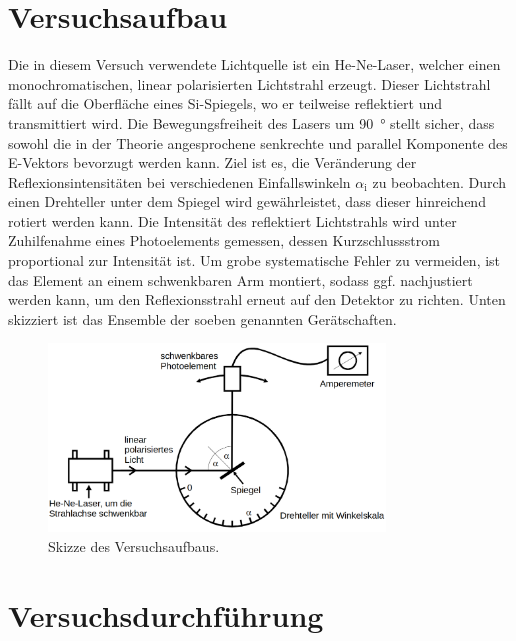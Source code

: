 



\section{Versuchsaufbau}
\label{sec:Versuchsaufbau}

Die in diesem Versuch verwendete Lichtquelle ist ein He-Ne-Laser, welcher einen monochromatischen, linear polarisierten Lichtstrahl erzeugt. Dieser Lichtstrahl 
fällt auf die Oberfläche eines Si-Spiegels, wo er teilweise reflektiert und transmittiert wird. Die Bewegungsfreiheit des Lasers um \qty{90}{\degree} stellt 
sicher, dass sowohl die in der Theorie angesprochene senkrechte und parallel Komponente des E-Vektors bevorzugt werden kann. Ziel ist es, die Veränderung der 
Reflexionsintensitäten bei verschiedenen Einfallswinkeln $\alpha_\text{i}$ zu beobachten. Durch einen Drehteller unter dem Spiegel wird gewährleistet, dass 
dieser hinreichend rotiert werden kann. Die Intensität des reflektiert Lichtstrahls wird unter Zuhilfenahme eines Photoelements gemessen, dessen Kurzschlussstrom 
proportional zur Intensität ist. Um grobe systematische Fehler zu vermeiden, ist das Element an einem schwenkbaren Arm montiert, sodass ggf. nachjustiert werden 
kann, um den Reflexionsstrahl erneut auf den Detektor zu richten. Unten skizziert ist das Ensemble der soeben genannten Gerätschaften.

\begin{figure}
    \centering
    \includegraphics[height=5cm]{Aufbau.png}
    \caption{Skizze des Versuchsaufbaus\cite{Versuchsanleitung_v407}.}
    \label{fig:Versuchsaufbau}
\end{figure}

\section{Versuchsdurchführung}
\label{sec:Durchfuehrung}

